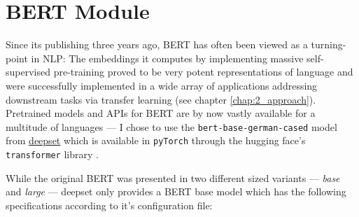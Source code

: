 \begin{landscape}\centering
\end{landscape}


\section{BERT Module}

Since its publishing three years ago, BERT \citep{devlin2018bert} has
often been viewed as a turning-point in NLP: The embeddings it computes
by implementing massive self-supervised pre-training proved to be very
potent representations of language and were successfully implemented in
a wide array of applications addressing downstream tasks via transfer
learning (see chapter \ref{chap:2_approach}). Pretrained models and
APIs for BERT are by now vastly available for a multitude of languages
--- I chose to use the \texttt{bert-base-german-cased} model from
\href{https://deepset.ai/german-bert}{deepset} which is available
in \texttt{pyTorch} through the hugging face's \texttt{transformer}
library \cite{wolf2019transformers}.

While the original BERT was presented in two different sized variants --- \emph{base}
and \emph{large} --- deepset only provides a BERT base model which has the following
specifications according to it's configuration file:


